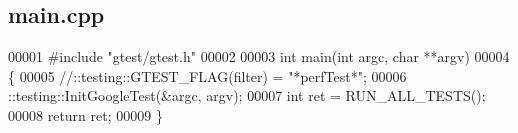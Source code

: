 \subsection{main.\+cpp}
\label{src_2tests_2main_8cpp_source}

\begin{DoxyCode}
00001 \textcolor{preprocessor}{#include "gtest/gtest.h"}
00002 
00003 \textcolor{keywordtype}{int} main(\textcolor{keywordtype}{int} argc, \textcolor{keywordtype}{char} **argv)
00004 \{
00005     \textcolor{comment}{//::testing::GTEST\_FLAG(filter) = "*perfTest*";}
00006     ::testing::InitGoogleTest(&argc, argv);
00007     \textcolor{keywordtype}{int} ret = RUN\_ALL\_TESTS();
00008     \textcolor{keywordflow}{return} ret;
00009 \}
\end{DoxyCode}
